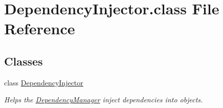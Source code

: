 \hypertarget{DependencyInjector_8class}{\section{Dependency\-Injector.\-class File Reference}
\label{DependencyInjector_8class}
}
\subsection*{Classes}
\begin{DoxyCompactItemize}
\item 
class \hyperlink{classDependencyInjector}{Dependency\-Injector}
\begin{DoxyCompactList}\small\item\em Helps the \hyperlink{classDependencyManager}{Dependency\-Manager} inject dependencies into objects. \end{DoxyCompactList}\end{DoxyCompactItemize}

